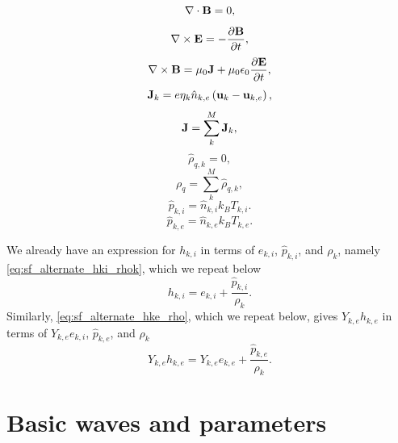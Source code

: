 \documentclass[a4paper,11pt]{report}
\begin{document}
\begin{equation}
    \label{eq:sf_mm_ms_maxwell_4_hat}
    \nabla \cdot \mathbf{B} = 0,
\end{equation}
\begin{equation}
    \label{eq:sf_mm_ms_maxwell_1_hat}
    \nabla \times \mathbf{E} = -\frac{ \partial \mathbf{B}}{\partial t},
\end{equation}
\begin{equation}
    \label{eq:sf_mm_ms_maxwell_2_hat}
    \nabla \times \mathbf{B} = \mu_0 \mathbf{J} + \mu_0 \epsilon_0 \frac{\partial \mathbf{E}}{\partial t},
\end{equation}
\begin{equation}
    \label{eq:sf_mm_ms_curr_density_hat}
    \mathbf{J}_k = e \eta_k \hat{n}_{k,e} \left( \mathbf{u}_k - \mathbf{u}_{k,e} \right),
\end{equation}
\begin{equation}
    \mathbf{J} = \sum_k^M \mathbf{J}_k,
\end{equation}
\begin{equation}
    \label{eq:sf_mm_ms_mass_density_hat}
    \hat{\rho}_{q,k} = 0,
\end{equation}
\begin{equation}
    \rho_q = \sum_k^M \hat{\rho}_{q,k},
\end{equation}
\begin{equation}
    \label{eq:sf_mm_ms_eos_ion_hat}
    \hat{p}_{k,i} = \hat{n}_{k,i} k_B T_{k,i}.
\end{equation}
\begin{equation}
    \label{eq:sf_mm_ms_eos_elec_hat}
    \hat{p}_{k,e} = \hat{n}_{k,e} k_B T_{k,e}.
\end{equation}

We already have an expression for $h_{k,i}$ in terms of $e_{k,i}$, $\hat{p}_{k,i}$, and $\rho_k$, namely \cref{eq:sf_alternate_hki_rhok}, which we repeat below
\begin{equation*}
    h_{k,i} = e_{k,i} + \frac{\hat{p}_{k,i}}{\rho_k}.
\end{equation*}
Similarly, \cref{eq:sf_alternate_hke_rho}, which we repeat below, gives $Y_{k,e} h_{k,e}$ in terms of $Y_{k,e} e_{k,i}$, $\hat{p}_{k,e}$, and $\rho_k$
\begin{equation*}
    Y_{k,e} h_{k,e} = Y_{k,e} e_{k,e} + \frac{\hat{p}_{k,e}}{\rho_k}.
\end{equation*}

\chapter{Basic waves and parameters}
\end{document}
